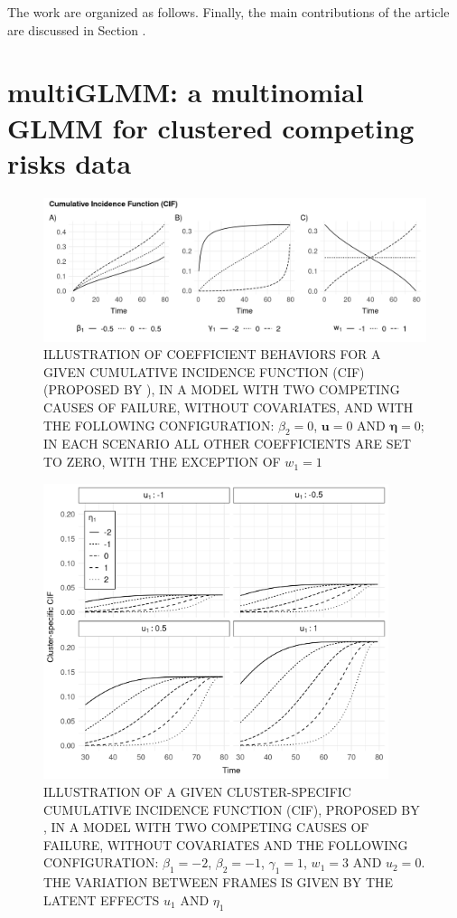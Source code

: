 \documentclass[a4paper,12pt]{article}
\begin{document}
The work are organized as follows. Finally, the main contributions of
the article are discussed in Section .

\section{multiGLMM: a multinomial GLMM for clustered competing risks data}
\label{model}

\begin{figure}[H]
 \centering \includegraphics[width=\textwidth]{pics/cifcoefs-1.png}
 \caption{ILLUSTRATION OF COEFFICIENT BEHAVIORS FOR A GIVEN CUMULATIVE
          INCIDENCE FUNCTION (CIF) (PROPOSED BY ),
          IN A MODEL WITH TWO COMPETING CAUSES OF FAILURE, WITHOUT
          COVARIATES, AND WITH THE FOLLOWING CONFIGURATION: \(\beta_{2}
          = 0\), \(\bm{u} = 0\) AND \(\bm{\eta} = 0\); IN EACH SCENARIO
          ALL OTHER COEFFICIENTS ARE SET TO ZERO, WITH THE EXCEPTION
          OF \(w_{1} = 1\)}
 \label{fig:cifcoefs}
\end{figure}

\begin{figure}[H]
 \centering
 \includegraphics[width=0.9\textwidth]{pics/cif-1.png}
 \caption{ILLUSTRATION OF A GIVEN CLUSTER-SPECIFIC CUMULATIVE INCIDENCE
          FUNCTION (CIF), PROPOSED BY , IN A MODEL
          WITH TWO COMPETING CAUSES OF FAILURE, WITHOUT COVARIATES AND
          THE FOLLOWING CONFIGURATION: \(\beta_{1} = -2\),
          \(\beta_{2} = -1\), \(\gamma_{1} = 1\), \(w_{1} = 3\) AND
          \(u_{2} = 0\). THE VARIATION BETWEEN FRAMES IS GIVEN BY THE
          LATENT EFFECTS \(u_{1}\) AND \(\eta_{1}\)}
 \label{fig:cif}
\end{figure}
\end{document}
